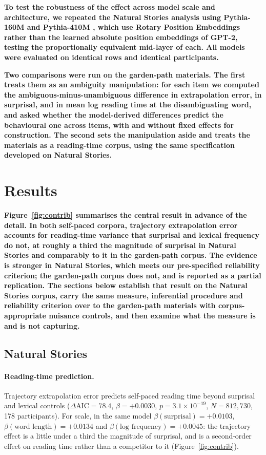 \documentclass[12pt]{article}
\newcommand{\new}[1]{{\bfseries #1}}
\begin{document}
\new{To test the robustness of the effect across model scale and architecture, we repeated the Natural Stories analysis using Pythia-160M and Pythia-410M \citep{biderman2023}, which use Rotary Position Embeddings rather than the learned absolute position embeddings of GPT-2, testing the proportionally equivalent mid-layer of each. All models were evaluated on identical rows and identical participants.}

\new{Two comparisons were run on the garden-path materials. The first treats them as an ambiguity manipulation: for each item we computed the ambiguous-minus-unambiguous difference in extrapolation error, in surprisal, and in mean log reading time at the disambiguating word, and asked whether the model-derived differences predict the behavioural one across items, with and without fixed effects for construction. The second sets the manipulation aside and treats the materials as a reading-time corpus, using the same specification developed on Natural Stories.}

\section{Results}

\new{Figure~\ref{fig:contrib} summarises the central result in advance of the
detail. In both self-paced corpora, trajectory extrapolation error accounts for
reading-time variance that surprisal and lexical frequency do not, at roughly a
third the magnitude of surprisal in Natural Stories and comparably to it in the
garden-path corpus. The evidence is stronger in Natural Stories, which meets our
pre-specified reliability criterion; the garden-path corpus does not, and is
reported as a partial replication. The sections below establish that result on the Natural
Stories corpus, carry the same measure, inferential procedure and reliability
criterion over to the garden-path materials with corpus-appropriate nuisance
controls, and
then examine what the measure is and is not capturing.}

\subsection{Natural Stories}

\new{\paragraph{Reading-time prediction.} Trajectory extrapolation error predicts self-paced reading time beyond surprisal and lexical controls ($\Delta\text{AIC} = 78.4$, $\beta = +0.0030$, $p = 3.1 \times 10^{-19}$, $N = 812{,}730$, 178 participants). For scale, in the same model $\beta(\text{surprisal}) = +0.0103$, $\beta(\text{word length}) = +0.0134$ and $\beta(\text{log frequency}) = +0.0045$: the trajectory effect is a little under a third the magnitude of surprisal, and is a second-order effect on reading time rather than a competitor to it (Figure~\ref{fig:contrib}).}
\end{document}
